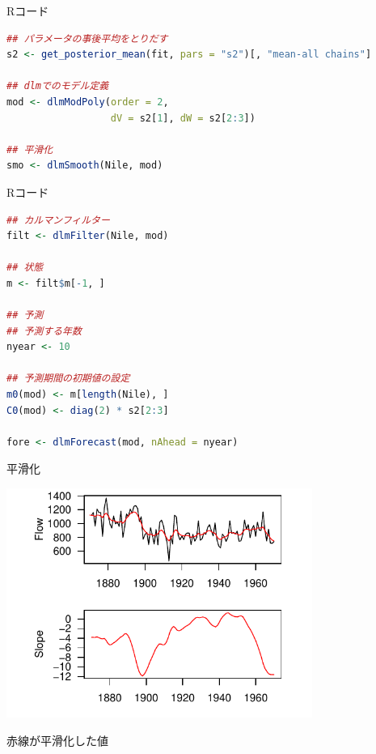 \documentclass[dvipdfmx,12pt]{beamer}
\begin{document}
\begin{frame}[fragile]{Rコード}
  \begin{lstlisting}[language=R]
## パラメータの事後平均をとりだす
s2 <- get_posterior_mean(fit, pars = "s2")[, "mean-all chains"]

## dlmでのモデル定義
mod <- dlmModPoly(order = 2,
                  dV = s2[1], dW = s2[2:3])

## 平滑化
smo <- dlmSmooth(Nile, mod)
  \end{lstlisting}
\end{frame}

\begin{frame}[fragile]{Rコード}
  \begin{lstlisting}[language=R]
## カルマンフィルター
filt <- dlmFilter(Nile, mod)

## 状態
m <- filt$m[-1, ]

## 予測
## 予測する年数
nyear <- 10

## 予測期間の初期値の設定
m0(mod) <- m[length(Nile), ]
C0(mod) <- diag(2) * s2[2:3]

fore <- dlmForecast(mod, nAhead = nyear)
  \end{lstlisting}
\end{frame}

\begin{frame}{平滑化}
  \begin{center}
    \includegraphics[width=10cm]{dlm2_smooth}
  \end{center}

  赤線が平滑化した値
\end{frame}
\end{document}
